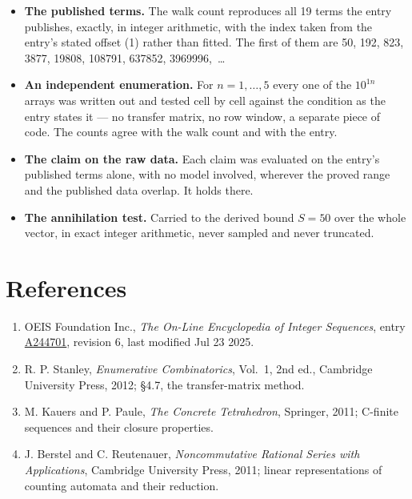 \documentclass[11pt]{article}
\theoremstyle{definition}
\begin{document}
\begin{itemize}

\item {\bfseries The published terms.} The walk count reproduces all 19 terms the entry publishes, exactly, in integer arithmetic, with the index taken from the entry's stated offset (1) rather than fitted. The first of them are 50, 192, 823, 3877, 19808, 108791, 637852, 3969996,~\dots

\item {\bfseries An independent enumeration.} For $n = 1,\dots,5$ every one of the $10^{1n}$ arrays was written out and tested cell by cell against the condition as the entry states it --- no transfer matrix, no row window, a separate piece of code. The counts agree with the walk count and with the entry.

\item {\bfseries The claim on the raw data.} Each claim was evaluated on the entry's published terms alone, with no model involved, wherever the proved range and the published data overlap. It holds there.

\item {\bfseries The annihilation test.} Carried to the derived bound $S = 50$ over the whole vector, in exact integer arithmetic, never sampled and never truncated.

\end{itemize}

\section{References}

\begin{enumerate}

\item OEIS Foundation Inc., \emph{The On-Line Encyclopedia of Integer Sequences}, entry \href{https://oeis.org/A244701}{A244701}, revision 6, last modified Jul 23 2025.

\item R. P. Stanley, \emph{Enumerative Combinatorics}, Vol.~1, 2nd ed., Cambridge University Press, 2012; \S4.7, the transfer-matrix method.

\item M. Kauers and P. Paule, \emph{The Concrete Tetrahedron}, Springer, 2011; C-finite sequences and their closure properties.

\item J. Berstel and C. Reutenauer, \emph{Noncommutative Rational Series with Applications}, Cambridge University Press, 2011; linear representations of counting automata and their reduction.

\end{enumerate}
\end{document}

